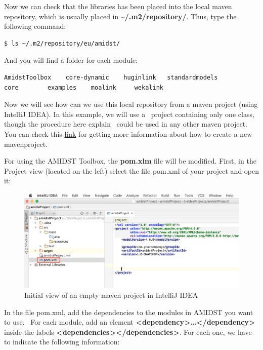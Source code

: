 \documentclass[10pt,a4paper]{article}
\begin{document}
Now we can check that the libraries has been placed into the local maven
repository, which is usually placed in
\textbf{\textasciitilde{}/.m2/repository/}. Thus, type the following
command:\\[3\baselineskip]

\begin{verbatim}
$ ls ~/.m2/repository/eu/amidst/ 
\end{verbatim}

And you will find a folder for each module:

\begin{verbatim}
AmidstToolbox    core-dynamic    huginlink   standardmodels
core        examples    moalink     wekalink
\end{verbatim}

Now we will see how can we use this local repository from a maven
project (using IntelliJ IDEA). In this example, we will use a~ project
containing only one class, though the procedure here explain~ could be
used in any other maven project. You can check this
\href{https://www.jetbrains.com/help/idea/2016.1/getting-started-with-maven.html}{link}
for getting more information about how to create a new mavenproject.\newline 

For using the AMIDST Toolbox, the \textbf{pom.xlm} file will be modified. First,
in the Project view (located on the left) select the file pom.xml of
your project and open it:\newline


\begin{figure}[h!]
\centering	
\includegraphics[width=12cm]{img/use_amidst05.png}
\caption{Initial view of an empty maven project in IntelliJ IDEA}
\end{figure}


In the file pom.xml, add the dependencies to the modules in AMIDST you
want to use.~ For each module, add an element
\textbf{\textless{}dependency\textgreater{}\textbf{\ldots{}\textless{}/dependency\textgreater{}}}
inside the labels
\textbf{\textless{}dependencies\textgreater{}\textless{}/dependencies\textgreater{}}.
For each one, we have to indicate the following
information:
\end{document}
